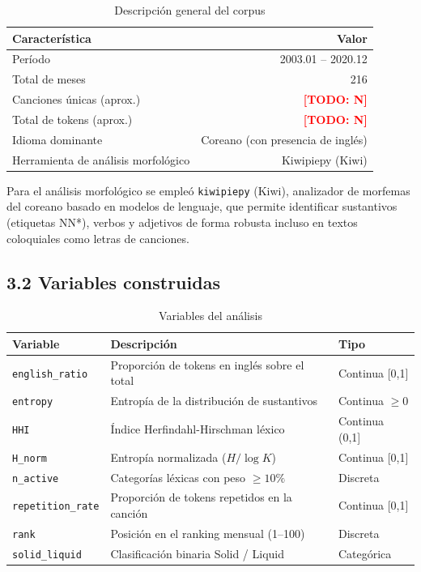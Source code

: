 \documentclass[11pt,a4paper]{article}
\newcommand{\todo}[1]{\textcolor{red}{\textbf{[TODO: #1]}}}
\begin{document}
\begin{table}[H]
\centering
\small
\begin{tabular}{lr}
\toprule
\textbf{Característica} & \textbf{Valor} \\
\midrule
Período                       & 2003.01 -- 2020.12 \\
Total de meses                & 216 \\
Canciones únicas (aprox.)     & \todo{N} \\
Total de tokens (aprox.)      & \todo{N} \\
Idioma dominante              & Coreano (con presencia de inglés) \\
Herramienta de análisis morfológico & Kiwipiepy (Kiwi) \\
\bottomrule
\end{tabular}
\caption{Descripción general del corpus}
\end{table}

Para el análisis morfológico se empleó \texttt{kiwipiepy} (Kiwi),
analizador de morfemas del coreano basado en modelos de lenguaje,
que permite identificar sustantivos (etiquetas NN*), verbos y adjetivos
de forma robusta incluso en textos coloquiales como letras de canciones.

\subsection*{3.2 Variables construidas}

\begin{table}[H]
\centering
\small
\begin{tabular}{lll}
\toprule
\textbf{Variable} & \textbf{Descripción} & \textbf{Tipo} \\
\midrule
\texttt{english\_ratio}   & Proporción de tokens en inglés sobre el total & Continua [0,1] \\
\texttt{entropy}          & Entropía de la distribución de sustantivos & Continua $\geq 0$ \\
\texttt{HHI}              & Índice Herfindahl-Hirschman léxico & Continua (0,1] \\
\texttt{H\_norm}          & Entropía normalizada ($H / \log K$) & Continua [0,1] \\
\texttt{n\_active}        & Categorías léxicas con peso $\geq 10\%$ & Discreta \\
\texttt{repetition\_rate} & Proporción de tokens repetidos en la canción & Continua [0,1] \\
\texttt{rank}             & Posición en el ranking mensual (1--100) & Discreta \\
\texttt{solid\_liquid}    & Clasificación binaria Solid / Liquid & Categórica \\
\bottomrule
\end{tabular}
\caption{Variables del análisis}
\end{table}
\end{document}
